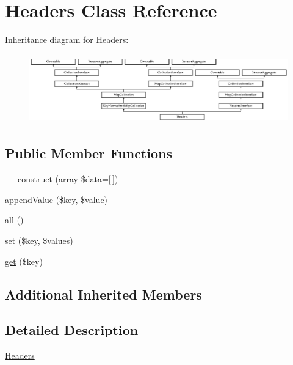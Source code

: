 \hypertarget{class_pes_1_1_http_1_1_headers}{}\section{Headers Class Reference}
\label{class_pes_1_1_http_1_1_headers}
Inheritance diagram for Headers\+:\begin{figure}[H]
\begin{center}
\leavevmode
\includegraphics[height=3.010753cm]{class_pes_1_1_http_1_1_headers}
\end{center}
\end{figure}
\subsection*{Public Member Functions}
\begin{DoxyCompactItemize}
\item 
\mbox{\hyperlink{class_pes_1_1_http_1_1_headers_aa02306a5f1b8f5dff3b54dd510fd00af}{\+\_\+\+\_\+construct}} (array \$data=\mbox{[}$\,$\mbox{]})
\item 
\mbox{\hyperlink{class_pes_1_1_http_1_1_headers_a03fe29986ea8750c4f56dedea98d2bd6}{append\+Value}} (\$key, \$value)
\item 
\mbox{\hyperlink{class_pes_1_1_http_1_1_headers_af9d14e4ae6227970ad603987781573ca}{all}} ()
\item 
\mbox{\hyperlink{class_pes_1_1_http_1_1_headers_a48fd9971b1dacbb991a7c35db3b7114a}{set}} (\$key, \$values)
\item 
\mbox{\hyperlink{class_pes_1_1_http_1_1_headers_a24a9bf83a1002d46ece83a93d14bd921}{get}} (\$key)
\end{DoxyCompactItemize}
\subsection*{Additional Inherited Members}


\subsection{Detailed Description}
\mbox{\hyperlink{class_pes_1_1_http_1_1_headers}{Headers}}

